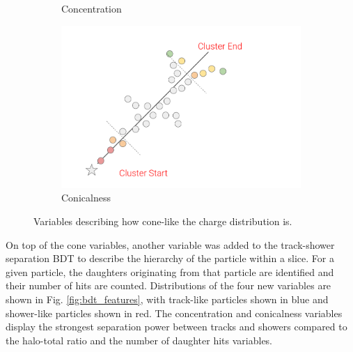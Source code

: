 \begin{figure}[hb!]
\begin{subfigure}[b]{0.495\textwidth}
            \caption{Concentration}%
            \label{fig:concentration}
        \end{subfigure}
        \hfill
        \begin{subfigure}[b]{0.495\textwidth}  
            \centering 
            \includegraphics[width=\textwidth]{Conicalness}
            \caption{Conicalness}%
            \label{fig:conicalness}
        \end{subfigure}
        \caption[Cone-like Variable Diagrams]{
	Variables describing how cone-like the charge distribution is.
	}
        \label{fig:cone_variables}
\end{figure}


On top of the cone variables, another variable was added to the track-shower separation BDT to describe the hierarchy of the particle within a slice.
For a given particle, the daughters originating from that particle are identified and their number of hits are counted.
Distributions of the four new variables are shown in Fig. \ref{fig:bdt_features}, with track-like particles shown in blue and shower-like particles shown in red.
The concentration and conicalness variables display the strongest separation power between tracks and showers compared to the halo-total ratio and the number of daughter hits variables.


